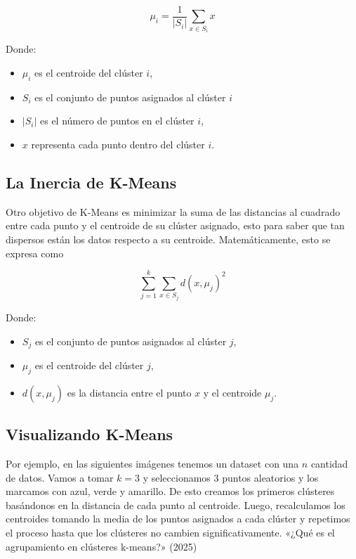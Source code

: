 \documentclass[
  spanish,
  letterpaper,
  DIV=11,
  numbers=noendperiod]{scrreprt}
\providecommand{\tightlist}{%
  \setlength{\itemsep}{0pt}\setlength{\parskip}{0pt}}
\begin{document}
\[\mu_i = \frac{1}{|S_i|} \sum_{x \in S_i} x\]

Donde:

\begin{itemize}
\tightlist
\item
  \(\mu_i\) es el centroide del clúster \(i\),
\item
  \(S_i\) es el conjunto de puntos asignados al clúster \(i\)
\item
  \(|S_i|\) es el número de puntos en el clúster \(i\),
\item
  \(x\) representa cada punto dentro del clúster \(i\).
\end{itemize}

\subsection{La Inercia de K-Means}\label{la-inercia-de-k-means}

Otro objetivo de K-Means es minimizar la suma de las distancias al
cuadrado entre cada punto y el centroide de su clúster asignado, esto
para saber que tan dispersos están los datos respecto a su centroide.
Matemáticamente, esto se expresa como

\[\sum_{j=1}^{k} \sum_{x \in S_j} d(x, \mu_j)^2\]

Donde:

\begin{itemize}
\tightlist
\item
  \(S_j\) es el conjunto de puntos asignados al clúster \(j\),
\item
  \(\mu_j\) es el centroide del clúster \(j\),
\item
  \(d(x, \mu_j)\) es la distancia entre el punto \(x\) y el centroide
  \(\mu_j\).
\end{itemize}

\subsection{Visualizando K-Means}\label{visualizando-k-means}

Por ejemplo, en las siguientes imágenes tenemos un dataset con una \(n\)
cantidad de datos. Vamos a tomar \(k=3\) y seleccionamos 3 puntos
aleatorios y los marcamos con azul, verde y amarillo. De esto creamos
los primeros clústeres basándonos en la distancia de cada punto al
centroide. Luego, recalculamos los centroides tomando la media de los
puntos asignados a cada clúster y repetimos el proceso hasta que los
clústeres no cambien significativamente. {«¿Qué es el agrupamiento en
clústeres k-means?»} (2025)
\end{document}
